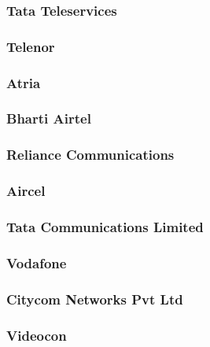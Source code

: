\documentclass{article}
\begin{document}
\subsubsection{Tata Teleservices}


\subsubsection{Telenor}


\subsubsection{Atria}


\subsubsection{Bharti Airtel}


\subsubsection{Reliance Communications}


\subsubsection{Aircel}


\subsubsection{Tata Communications Limited}


\subsubsection{Vodafone}


\subsubsection{Citycom Networks Pvt Ltd}


\subsubsection{Videocon}

\end{document}
